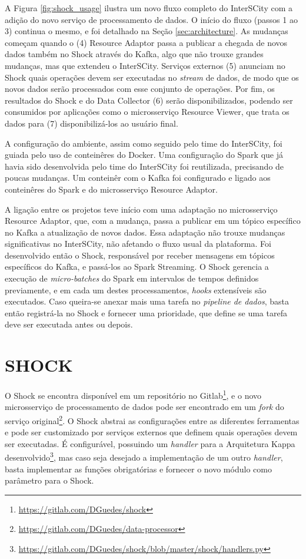 A Figura \ref{fig:shock_usage} ilustra um novo fluxo completo do InterSCity
com a adição do novo serviço de processamento de dados. O início do fluxo
(passos 1 ao 3) continua o mesmo, e foi detalhado na Seção
\ref{sec:architecture}. As mudanças começam quando o (4) Resource Adaptor passa
a publicar a chegada de novos dados também no Shock através do Kafka, algo que
não trouxe grandes mudanças, mas que extendeu o InterSCity. Serviços externos
(5) anunciam no Shock quais operações devem ser executadas no \textit{stream}
de dados, de modo que os novos dados serão processados com esse conjunto de
operações. Por fim, os resultados do Shock e do Data Collector (6) serão
disponibilizados, podendo ser consumidos por aplicações como o microsserviço
Resource Viewer, que trata os dados para (7) disponibilizá-los ao usuário final.

A configuração do ambiente, assim como seguido pelo time do InterSCity, foi
guiada pelo uso de conteinêres do Docker. Uma configuração do Spark
que já havia sido desenvolvida pelo time do InterSCity foi reutilizada,
precisando de poucas mudanças. Um conteinêr com o Kafka foi configurado e
ligado aos conteinêres do Spark e do microsserviço Resource Adaptor.

A ligação entre os projetos teve início com uma adaptação no microsserviço
Resource Adaptor, que, com a mudança, passa a publicar em um tópico específico
no Kafka a atualização de novos dados. Essa adaptação não trouxe mudanças
significativas no InterSCity, não afetando o fluxo usual da plataforma. Foi
desenvolvido então o Shock, responsável por receber mensagens em tópicos
específicos do Kafka, e passá-los ao Spark Streaming. O Shock gerencia a
execução de \textit{micro-batches} do Spark em intervalos de tempos definidos
previamente, e em cada um destes processamentos, \textit{hooks} extensíveis são
executados. Caso queira-se anexar mais uma tarefa no
\textit{pipeline de dados}, basta então registrá-la no Shock e fornecer uma
prioridade, que define se uma tarefa deve ser executada antes ou depois.

\section{SHOCK}

O Shock se encontra disponível em um repositório no
Gitlab\footnote{\url{https://gitlab.com/DGuedes/shock}}, e o novo microsserviço
de processamento de dados pode ser encontrado em um \textit{fork} do serviço
original\footnote{\url{https://gitlab.com/DGuedes/data-processor}}. O Shock
abstrai as configurações entre as diferentes ferramentas e pode ser customizado
por serviços externos que definem quais operações devem ser executadas.
É configurável, possuindo um \textit{handler} para a Arquitetura Kappa
desenvolvido\footnote{\url{https://gitlab.com/DGuedes/shock/blob/master/shock/handlers.py}},
mas caso seja desejado a implementação de um outro \textit{handler}, basta
implementar as funções obrigatórias e fornecer o novo módulo como parâmetro
para o Shock.

